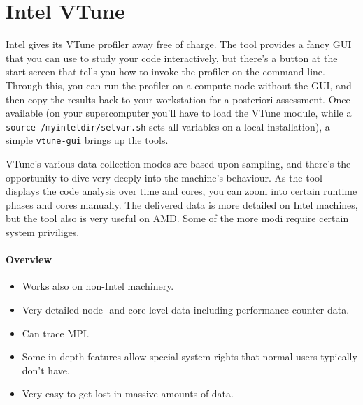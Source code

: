 \section{Intel VTune} 
\label{section:localisation:vtune}

Intel gives its VTune profiler away free of charge.
The tool provides a fancy GUI that you can use to study your code interactively,
but there's a button at the start screen that tells you how to invoke the
profiler on the command line.
Through this, you can run the profiler on a compute node without the GUI, and
then copy the results back to your workstation for a posteriori assessment.
Once available (on your supercomputer you'll have to load the VTune module,
while a \texttt{source /myinteldir/setvar.sh} sets all variables on a local
installation), a simple \texttt{vtune-gui} brings up the tools.

VTune's various data collection modes are based upon sampling, and there's the
opportunity to dive very deeply into the machine's behaviour.
As the tool displays the code analysis over time and cores, you can zoom into
certain runtime phases and cores manually. 
The delivered data is more detailed on Intel machines, but the tool also is very
useful on AMD.
Some of the more modi require certain system priviliges.


\paragraph*{Overview}
 
\begin{itemize}[noitemsep]
  \item[$\boxplus$] Works also on non-Intel machinery.
  \item[$\boxplus$] Very detailed node- and core-level data including
  performance counter data.
  \item[$\boxplus$] Can trace MPI.
\end{itemize}
 
 
\begin{itemize}[noitemsep]
  \item[$\boxminus$] Some in-depth features allow special system rights that
  normal users typically don't have.
  \item[$\boxminus$] Very easy to get lost in massive amounts of data.
\end{itemize}

